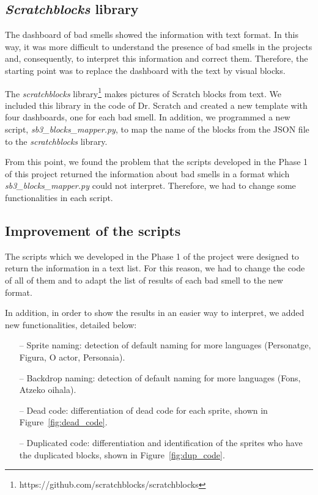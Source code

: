 \subsection{\textit{Scratchblocks} library}
\label{subsec:scratchblocks}

The dashboard of bad smells showed the information with text format. In this way, it was more difficult to understand the presence of bad smells in the projects and, consequently, to interpret this information and correct them. Therefore, the starting point was to replace the dashboard with the text by visual blocks.

The \textit{scratchblocks} library\footnote{https://github.com/scratchblocks/scratchblocks} makes pictures of Scratch blocks from text. We included this library in the code of Dr. Scratch and created a new template with four dashboards, one for each bad smell. In addition, we programmed a new script, \textit{sb3\_blocks\_mapper.py}, to map the name of the blocks from the JSON file to the \textit{scratchblocks} library.

From this point, we found the problem that the scripts developed in the Phase 1 of this project returned the information about bad smells in a format which \textit{sb3\_blocks\_mapper.py} could not interpret. Therefore, we had to change some functionalities in each script.


\subsection{Improvement of the scripts}
\label{subsec:improvement_scripts}

The scripts which we developed in the Phase 1 of the project were designed to return the information in a text list. For this reason, we had to change the code of all of them and to adapt the list of results of each bad smell to the new format.

In addition, in order to show the results in an easier way to interpret, we added new functionalities, detailed below:

\begin{itemize}
    \item[--] Sprite naming: detection of default naming for more languages (Personatge, Figura, O actor, Personaia).
    \item[--] Backdrop naming: detection of default naming for more languages (Fons, Atzeko oihala).
    \item[--] Dead code: differentiation of dead code for each sprite, shown in Figure~\ref{fig:dead_code}.
    \item[--] Duplicated code: differentiation and identification of the sprites who have the duplicated blocks, shown in Figure~\ref{fig:dup_code}.
\end{itemize}

